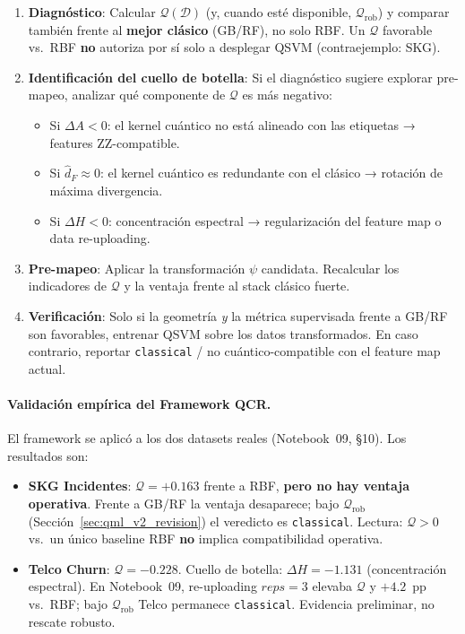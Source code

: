 \begin{enumerate}
    \item \textbf{Diagnóstico}: Calcular $\mathcal{Q}(\mathcal{D})$ (y, cuando esté disponible, $\mathcal{Q}_{\mathrm{rob}}$) y comparar también frente al \textbf{mejor clásico} (GB/RF), no solo RBF. Un $\mathcal{Q}$ favorable vs.\ RBF \textbf{no} autoriza por sí solo a desplegar QSVM (contraejemplo: SKG).

    \item \textbf{Identificación del cuello de botella}: Si el diagnóstico sugiere explorar pre-mapeo, analizar qué componente de $\mathcal{Q}$ es más negativo:
    \begin{itemize}
        \item Si $\Delta A < 0$: el kernel cuántico no está alineado con las etiquetas → features ZZ-compatible.
        \item Si $\hat{d}_F \approx 0$: el kernel cuántico es redundante con el clásico → rotación de máxima divergencia.
        \item Si $\Delta H < 0$: concentración espectral → regularización del feature map o data re-uploading.
    \end{itemize}

    \item \textbf{Pre-mapeo}: Aplicar la transformación $\psi$ candidata. Recalcular los indicadores de $\mathcal{Q}$ y la ventaja frente al stack clásico fuerte.

    \item \textbf{Verificación}: Solo si la geometría \emph{y} la métrica supervisada frente a GB/RF son favorables, entrenar QSVM sobre los datos transformados. En caso contrario, reportar \texttt{classical} / no cuántico-compatible con el feature map actual.
\end{enumerate}

\paragraph{Validación empírica del Framework QCR.}
El framework se aplicó a los dos datasets reales (Notebook~09, §10). Los resultados son:
\begin{itemize}
    \item \textbf{SKG Incidentes}: $\mathcal{Q}=+0.163$ frente a RBF, \textbf{pero no hay ventaja operativa}. Frente a GB/RF la ventaja desaparece; bajo $\mathcal{Q}_{\mathrm{rob}}$ (Sección~\ref{sec:qml_v2_revision}) el veredicto es \texttt{classical}. Lectura: $\mathcal{Q}>0$ vs.\ un único baseline RBF \textbf{no} implica compatibilidad operativa.
    \item \textbf{Telco Churn}: $\mathcal{Q}=-0.228$. Cuello de botella: $\Delta H = -1.131$ (concentración espectral). En Notebook~09, re-uploading $reps=3$ elevaba $\mathcal{Q}$ y $+4.2$~pp vs.\ RBF; bajo $\mathcal{Q}_{\mathrm{rob}}$ Telco permanece \texttt{classical}. Evidencia preliminar, no rescate robusto.
\end{itemize}

